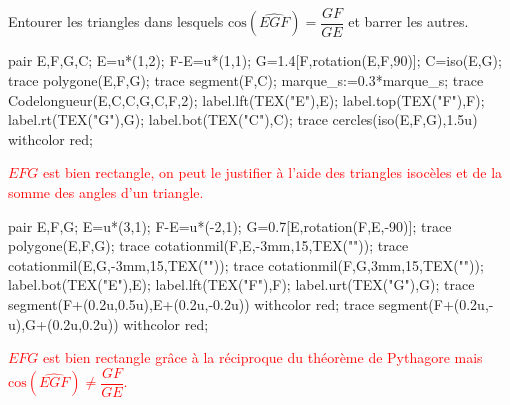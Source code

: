     Entourer les triangles dans lesquels \mbox{$\text{cos}(\widehat{EGF})=\dfrac{GF}{GE}$} et barrer les autres.

    \begin{minipage}{0.45\linewidth}
        \begin{Geometrie}
            pair E,F,G,C;
            E=u*(1,2);
            F-E=u*(1,1);
            G=1.4[F,rotation(E,F,90)];
            C=iso(E,G);
            trace polygone(E,F,G);
            trace segment(F,C);
            marque_s:=0.3*marque_s;
            trace Codelongueur(E,C,C,G,C,F,2);
            label.lft(TEX("E"),E);
            label.top(TEX("F"),F);
            label.rt(TEX("G"),G);
            label.bot(TEX("C"),C);
            trace cercles(iso(E,F,G),1.5u) withcolor red;
        \end{Geometrie}
        \textcolor{red}{$EFG$ est bien rectangle, on peut le justifier à l'aide des triangles isocèles et de la somme des angles d'un triangle.}

        \bigskip
        \begin{Geometrie}
            pair E,F,G;
            E=u*(3,1);
            F-E=u*(-2,1);
            G=0.7[E,rotation(F,E,-90)];
            trace polygone(E,F,G);
            trace cotationmil(F,E,-3mm,15,TEX(""));
            trace cotationmil(E,G,-3mm,15,TEX(""));
            trace cotationmil(F,G,3mm,15,TEX(""));
            label.bot(TEX("E"),E);
            label.lft(TEX("F"),F);
            label.urt(TEX("G"),G);
            trace segment(F+(0.2u,0.5u),E+(0.2u,-0.2u)) withcolor red;
            trace segment(F+(0.2u,-u),G+(0.2u,0.2u)) withcolor red;
        \end{Geometrie}
        \textcolor{red}{$EFG$ est bien rectangle grâce à la réciproque du théorème de Pythagore mais $\text{cos}(\widehat{EGF})\neq\dfrac{GF}{GE}$.}
    \end{minipage}
    \hfill
